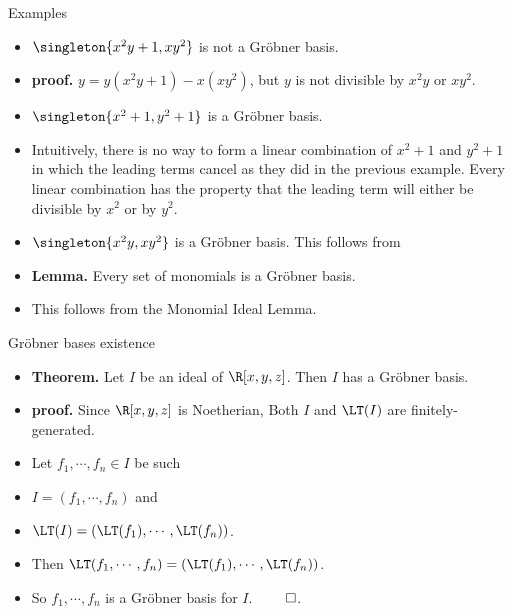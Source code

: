 \documentclass{beamer}
\begin{document}


\begin{frame}{Examples}

\begin{itemize}
  \item $\singleton{x^2y+1, xy^2}$ is not a Gr\"{o}bner basis.
  \item \textbf{proof.} $y = y(x^2y+1) -x(xy^2)$, but $y$ is not divisible by $x^2y$ or $xy^2$.
  \item $\singleton{x^2 + 1, y^2 + 1}$ is a Gr\"{o}bner basis.
  \item Intuitively, there is no way to form a linear combination of $x^2 + 1$ and $y^2 + 1$
  in which the leading terms cancel as they did in the previous example. Every linear combination has the property that the leading term will either be divisible by $x^2$ or by $y^2$.
  \item $\singleton{x^2y, xy^2}$ is a Gr\"{o}bner basis. This follows from
  \item \textbf{Lemma.} Every set of monomials is a Gr\"{o}bner basis.
  \item This follows from the Monomial Ideal Lemma.
\end{itemize}

\end{frame}



\begin{frame}{Gr\"{o}bner bases existence}

\begin{itemize}
  \item \textbf{Theorem.} Let $I$ be an ideal of $\R[x,y,z]$. Then $I$ has a Gr\"{o}bner basis.
  \item \textbf{proof.} Since $\R[x,y,z]$ is Noetherian, Both $I$ and $\LT(I)$ are finitely-generated.
  \item Let $f_1,\cdots,f_n\in I$ be such
  \item $I = (f_1,\cdots,f_n)$ and
  \item $\LT(I) = (\LT(f_1),\cdots,\LT(f_n))$.
  \item Then $\LT(f_1,\cdots,f_n) = (\LT(f_1),\cdots,\LT(f_n))$.
  \item So $f_1,\cdots,f_n$ is a Gr\"{o}bner basis for $I$. $\qed$.
\end{itemize}

\end{frame}
\end{document}
